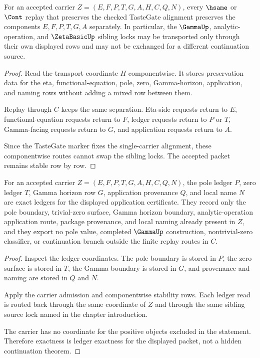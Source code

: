 \begin{theorem}
\label{thm:zeta-continuation-application-componentwise-stability}
For an accepted carrier $Z=(E,F,P,T,G,A,H,C,Q,N)$, every $\hsame$ or $\Cont$ replay that preserves the checked TasteGate alignment preserves the components $E,F,P,T,G,A$ separately. In particular, the $\GammaUp$, analytic-operation, and $\ZetaBasicUp$ sibling locks may be transported only through their own displayed rows and may not be exchanged for a different continuation source.
\end{theorem}
\begin{proof}
Read the transport coordinate $H$ componentwise. It stores preservation data for the eta, functional-equation, pole, zero, Gamma-horizon, application, and naming rows without adding a mixed row between them.

Replay through $C$ keeps the same separation. Eta-side requests return to $E$, functional-equation requests return to $F$, ledger requests return to $P$ or $T$, Gamma-facing requests return to $G$, and application requests return to $A$.

Since the TasteGate marker fixes the single-carrier alignment, these componentwise routes cannot swap the sibling locks. The accepted packet remains stable row by row.
\end{proof}

\begin{theorem}
\label{thm:zeta-continuation-application-ledger-exactness}
For an accepted carrier $Z=(E,F,P,T,G,A,H,C,Q,N)$, the pole ledger $P$, zero ledger $T$, Gamma horizon row $G$, application provenance $Q$, and local name $N$ are exact ledgers for the displayed application certificate. They record only the pole boundary, trivial-zero surface, Gamma horizon boundary, analytic-operation application route, package provenance, and local naming already present in $Z$, and they export no pole value, completed $\GammaUp$ construction, nontrivial-zero classifier, or continuation branch outside the finite replay routes in $C$.
\end{theorem}
\begin{proof}
Inspect the ledger coordinates. The pole boundary is stored in $P$, the zero surface is stored in $T$, the Gamma boundary is stored in $G$, and provenance and naming are stored in $Q$ and $N$.

Apply the carrier admission and componentwise stability rows. Each ledger read is routed back through the same coordinate of $Z$ and through the same sibling source lock named in the chapter introduction.

The carrier has no coordinate for the positive objects excluded in the statement. Therefore exactness is ledger exactness for the displayed packet, not a hidden continuation theorem.
\end{proof}

